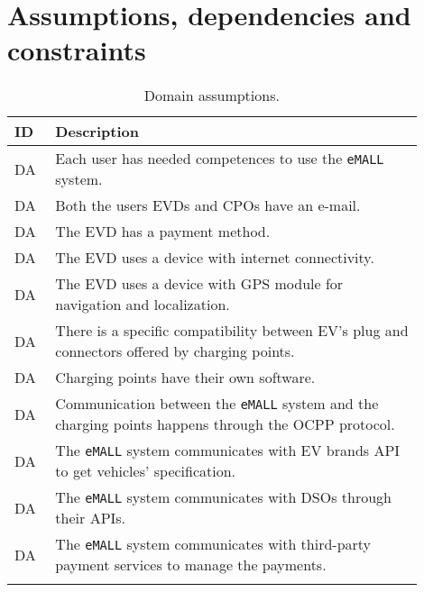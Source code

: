 \section{Assumptions, dependencies and constraints}
\label{sec:assumptions_dependencies_and_constraints}%
\setcounter{da}{1}
\newcommand{\cda}{\theda\stepcounter{da}}
\begin{center}
    \begin{longtable}{ |l|p{0.9\linewidth}| }
        \hline
        \textbf{ID} & \textbf{Description}                                                                                     \\
        \hline
        DA\cda      & Each user has needed competences to use the \verb|eMALL| system.                                         \\
        \hline
        DA\cda      & Both the users EVDs and CPOs have an e-mail.                                                             \\
        \hline
        DA\cda      & The EVD has a payment method.                                                                            \\
        \hline
        DA\cda      & The EVD uses a device with internet connectivity.                                                        \\
        \hline
        DA\cda      & The EVD uses a device with GPS module for navigation and localization.                                   \\
        \hline
        DA\cda      & There is a specific compatibility between EV's plug and connectors offered by charging points.           \\
        \hline
        DA\cda      & Charging points have their own software.                                                                 \\
        \hline
        DA\cda      & Communication between the \verb|eMALL| system and the charging points happens through the OCPP protocol. \\
        \hline
        DA\cda      & The \verb|eMALL| system communicates with EV brands API to get vehicles' specification.                  \\
        \hline
        DA\cda      & The \verb|eMALL| system communicates with DSOs through their APIs.                                       \\
        \hline
        DA\cda      & The \verb|eMALL| system communicates with third-party payment services to manage the payments.           \\
        \hline
        \caption{Domain assumptions.}
        \label{tab:domainassmptn_tab}%
    \end{longtable}
\end{center}